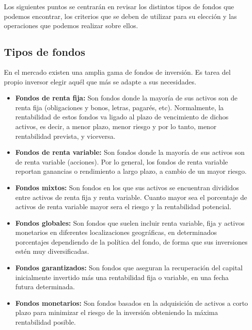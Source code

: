 \documentclass[12pt, a4paper]{book}
\begin{document}
Los siguientes puntos se centrarán en revisar los distintos tipos de fondos que podemos encontrar, los criterios que se deben de utilizar para su elección y las operaciones que podemos realizar sobre ellos.

\subsection{Tipos de fondos }

En el mercado existen una amplia gama de fondos de inversión. Es tarea del propio inversor elegir aquél que más se adapte a sus necesidades.

\begin{itemize}
	\item \textbf{Fondos de renta fija:} Son fondos donde la mayoría de sus activos son de renta fija (obligaciones y bonos, letras, pagarés, etc). Normalmente, la rentabilidad de estos fondos va ligado al plazo de vencimiento de dichos activos, es decir, a menor plazo, menor riesgo y por lo tanto, menor rentabilidad prevista, y viceversa.
	\item \textbf{Fondos de renta variable:} Son fondos donde la mayoría de sus activos son de renta variable (acciones). Por lo general, los fondos de renta variable reportan ganancias o rendimiento a largo plazo, a cambio de un mayor riesgo.
	
		\newpage
	
	\item \textbf{Fondos mixtos:} Son fondos en los que sus activos se encuentran divididos entre activos de renta fija y renta variable. Cuanto mayor sea el porcentaje de activos de renta variable mayor sera el riesgo y la rentabilidad potencial.
	\item \textbf{Fondos globales:} Son fondos que suelen incluir renta variable, fija y activos monetarios en diferentes localizaciones geográficas, en determinados porcentajes dependiendo de la política del fondo, de forma que sus inversiones estén muy diversificadas.
	\item \textbf{Fondos garantizados:} Son fondos que aseguran la recuperación del capital inicialmente invertido más una rentabilidad fija o variable, en una fecha futura determinada.
	\item \textbf{Fondos monetarios:} Son fondos basados en la adquisición de activos a corto plazo para minimizar el riesgo de la inversión obteniendo la máxima rentabilidad posible.
\end{itemize}
\end{document}
